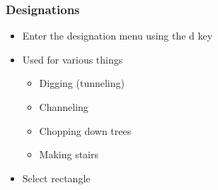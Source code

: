 \begin{frame}
\frametitle{Designations}
\begin{itemize}
\item Enter the designation menu using the d key
\item Used for various things
\begin{itemize}
	\item Digging (tunneling)
	\item Channeling
	\item Chopping down trees
	\item Making stairs
\end{itemize}
\item Select rectangle
\end{itemize}
\end{frame}

